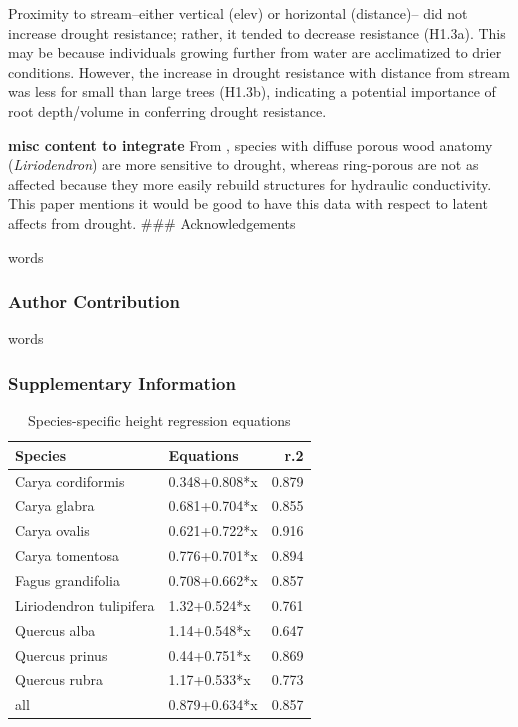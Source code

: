 \documentclass[]{article}
\begin{document}
Proximity to stream--either vertical (elev) or horizontal (distance)--
did not increase drought resistance; rather, it tended to decrease
resistance (H1.3a). This may be because individuals growing further from
water are acclimatized to drier conditions. However, the increase in
drought resistance with distance from stream was less for small than
large trees (H1.3b), indicating a potential importance of root
depth/volume in conferring drought resistance.

\textbf{misc content to integrate} From \citep{kannenberg_linking_2019},
species with diffuse porous wood anatomy (\emph{Liriodendron}) are more
sensitive to drought, whereas ring-porous are not as affected because
they more easily rebuild structures for hydraulic conductivity. This
paper mentions it would be good to have this data with respect to latent
affects from drought. \#\#\# Acknowledgements

words

\subsubsection{Author Contribution}\label{author-contribution}

words

\subsubsection{Supplementary
Information}\label{supplementary-information}

\begin{table}[!h]

\caption{\label{tab:Table S1}Species-specific height regression equations}
\centering
\begin{tabular}{llr}
\toprule
Species & Equations & r.2\\
\midrule
Carya cordiformis & 0.348+0.808*x & 0.879\\
Carya glabra & 0.681+0.704*x & 0.855\\
Carya ovalis & 0.621+0.722*x & 0.916\\
Carya tomentosa & 0.776+0.701*x & 0.894\\
Fagus grandifolia & 0.708+0.662*x & 0.857\\
\addlinespace
Liriodendron tulipifera & 1.32+0.524*x & 0.761\\
Quercus alba & 1.14+0.548*x & 0.647\\
Quercus prinus & 0.44+0.751*x & 0.869\\
Quercus rubra & 1.17+0.533*x & 0.773\\
all & 0.879+0.634*x & 0.857\\
\bottomrule
\end{tabular}
\end{table}
\end{document}
